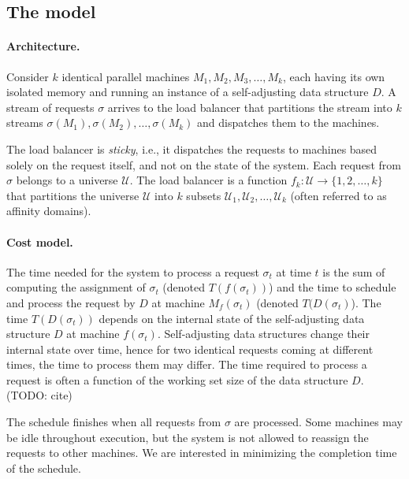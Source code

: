 \subsection{The model}
\label{sec:model}

\paragraph{Architecture.}

Consider $k$ identical parallel machines $M_1, M_2, M_3, \ldots, M_k$, each having its own isolated memory and running an instance of a self-adjusting data structure $D$. A stream of requests $\sigma$ arrives to the load balancer that partitions the stream into $k$ streams $\sigma(M_1), \sigma(M_2), \ldots, \sigma(M_k)$ and dispatches them to the machines.

The load balancer is \emph{sticky}, i.e., it dispatches the requests to machines based solely on the request itself, and not on the state of the system.
Each request from $\sigma$ belongs to a universe $\mathcal{U}$. 
The load balancer is a function $f_k : \mathcal{U} \to \{1, 2, \ldots, k\}$ that partitions the universe $\mathcal{U}$ into $k$ subsets $\mathcal{U}_1, \mathcal{U}_2, \ldots, \mathcal{U}_k$ (often referred to as affinity domains).

\paragraph{Cost model.}

The time needed for the system to process a request $\sigma_t$ at time $t$ is the sum of computing the assignment of $\sigma_t$ (denoted $T(f(\sigma_t))$) and the time to schedule and process the request by $D$ at machine $M_f(\sigma_t)$ (denoted $T(D(\sigma_t)$).
The time $T(D(\sigma_t))$ depends on the internal state of the self-adjusting data structure $D$ at machine $f(\sigma_t)$.
Self-adjusting data structures change their internal state over time, hence for two identical requests coming at different times, the time to process them may differ.
The time required to process a request is often a function of the working set size of the data structure $D$. (TODO: cite)

The schedule finishes when all requests from $\sigma$ are processed. Some machines may be idle throughout execution, but the system is not allowed to reassign the requests to other machines.
We are interested in minimizing the completion time of the schedule.

